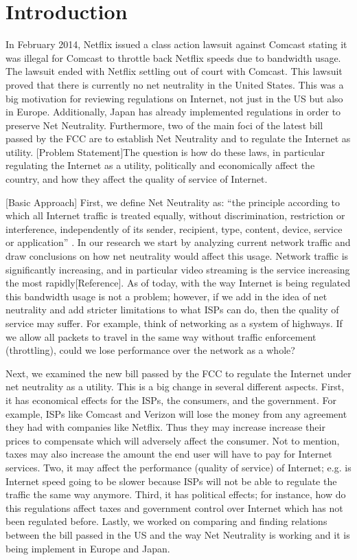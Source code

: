 \documentclass{sigcomm-alternate}
\begin{document}
\section{Introduction}
In February 2014, Netflix issued a class action lawsuit against Comcast stating it was illegal for Comcast to throttle back Netflix speeds due to bandwidth usage.  The lawsuit ended with Netflix settling out of court with Comcast. This lawsuit proved that there is currently no net neutrality in the United States. This was a big motivation for reviewing regulations on Internet, not just in the US but also in Europe. Additionally, Japan has already implemented regulations in order to preserve Net Neutrality. Furthermore, two of the main foci of the latest bill passed by the FCC are to establish Net Neutrality and to regulate the Internet as utility. [Problem Statement]The question is how do these laws, in particular regulating the Internet as a utility, politically and economically affect the country, and how they affect the quality of service of Internet. 

[Basic Approach]
First, we define Net Neutrality as: “the principle according to which all Internet traffic is treated equally, without discrimination, restriction or interference, independently of its sender, recipient, type, content, device, service or application” \cite{gigaom}. In our research we start by analyzing current network traffic and draw conclusions on how net neutrality would affect this usage. Network traffic is significantly increasing, and in particular video streaming is the service increasing the most rapidly[Reference]. As of today, with the way Internet is being regulated this bandwidth usage is not a problem; however, if we add in the idea of net neutrality and add stricter limitations to what ISPs can do, then the quality of service may suffer.  For example, think of networking as a system of highways. If we allow all packets to travel in the same way without traffic enforcement (throttling), could we lose performance over the network as a whole? \cite{tandlInfographic}

Next, we examined the new bill passed by the FCC to regulate the Internet under net neutrality as a utility. This is a big change in several different aspects. First, it has economical effects for the ISPs, the consumers, and the government. For example, ISPs like Comcast and Verizon will lose the money from any agreement they had with companies like Netflix.  Thus they may increase increase their prices to compensate which will adversely affect the consumer. Not to mention, taxes may also increase the amount the end user will have to pay for Internet services. Two, it may affect the performance (quality of service) of Internet; e.g. is Internet speed going to be slower because ISPs will not be able to regulate the traffic the same way anymore. Third, it has political effects; for instance, how do this regulations affect taxes and government control over Internet which has not been regulated before. Lastly, we worked on comparing and finding relations between the bill passed in the US and the way Net Neutrality is working and it is being implement in Europe and Japan.
\end{document}
